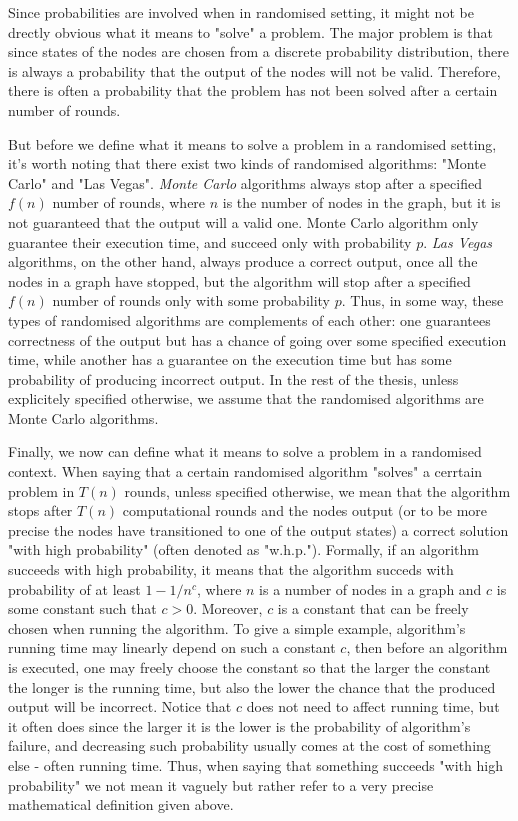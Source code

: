 Since probabilities are involved when in randomised setting, it might not be
drectly obvious what it means to "solve" a problem. The major problem is that
since states of the nodes are chosen from a discrete probability distribution,
there is always a probability that the output of the nodes will not be valid.
Therefore, there is often a probability that the problem has not been solved
after a certain number of rounds.

But before we define what it means to solve a problem in a randomised setting, it's
worth noting that there exist two kinds of randomised algorithms: "Monte Carlo" and
"Las Vegas". \emph{Monte Carlo} algorithms always stop after a specified $f(n)$
number of rounds, where $n$ is the number of nodes in the graph, but
it is not guaranteed that the output will a valid one. Monte Carlo algorithm
only guarantee their execution time, and succeed only with probability $p$.
\emph{Las Vegas} algorithms, on the other hand, always produce a correct output,
once all the nodes in a graph have stopped, but the algorithm will stop after a
specified $f(n)$ number of rounds only with some probability $p$. Thus, in some
way, these types of randomised algorithms are complements of each other:
one guarantees correctness of the output but has a chance of going over some
specified execution time, while another has a guarantee on the execution time
but has some probability of producing incorrect output. In the rest of the thesis,
unless explicitely specified otherwise, we assume that the randomised algorithms
are Monte Carlo algorithms.

Finally, we now can define what it means to solve a problem in a randomised context.
When saying that a certain randomised algorithm "solves" a cerrtain problem in
$T(n)$ rounds, unless specified otherwise, we mean that the algorithm stops after
$T(n)$ computational rounds and the nodes output (or to be more precise the nodes
have transitioned to one of the output states) a correct solution "with high
probability" (often denoted as "w.h.p."). Formally, if an algorithm succeeds with
high probability, it means that the algorithm succeds with probability of at least
$1 - 1 / n^c$, where $n$ is a number of nodes in a graph and $c$ is some constant
such that $c > 0$. Moreover, $c$ is a constant that can be freely chosen when 
running the algorithm. To give a simple example, algorithm's running time may
linearly depend on such a constant $c$, then before an algorithm is executed,
one may freely choose the constant so that the larger the constant the longer is
the running time, but also the lower the chance that the produced output will
be incorrect. Notice that $c$ does not need to affect running time, but it often
does since the larger it is the lower is the probability of algorithm's failure,
and decreasing such probability usually comes at the cost of something else - 
often running time. Thus, when saying that something succeeds "with high probability"
we not mean it vaguely but rather refer to a very precise mathematical definition 
given above.


